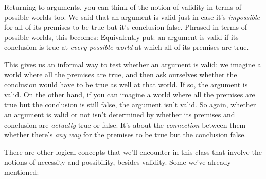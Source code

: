 Returning to arguments, you can think of the notion of validity in terms of possible worlds too.  We said that an argument is valid just in case it's \emph{impossible} for all of its premises to be true but it's conclusion false.  Phrased in terms of possible worlds, this becomes:
Equivalently put: an argument is valid if its conclusion is true at \emph{every possible world} at which all of its premises are true. 

This gives us an informal way to test whether an argument is valid: we imagine a world where all the premises are true, and then ask ourselves whether the conclusion would have to be true as well at that world.  If so, the argument is valid.  On the other hand, if you can imagine a world where all the premises are true but the conclusion is still false, the argument isn't valid.  So again, whether an argument is valid or not isn't determined by whether its premises and conclusion are \emph{actually} true or false.  It's about the \emph{connection} between them --- whether there's \emph{any way} for the premises to be true but the conclusion false.

There are other logical concepts that we'll encounter in this class that involve the notions of necessity and possibility, besides validity.  Some we've already mentioned:


